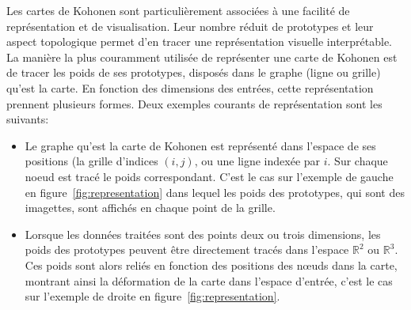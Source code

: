 Les cartes de Kohonen sont particulièrement associées à une facilité de représentation et de visualisation. Leur nombre réduit de prototypes et leur aspect topologique permet d'en tracer une représentation visuelle interprétable.
La manière la plus couramment utilisée de représenter une carte de Kohonen est de tracer les poids de ses prototypes, disposés dans le graphe (ligne ou grille) qu'est la carte. En fonction des dimensions des entrées, cette représentation prennent plusieurs formes. Deux exemples courants de représentation sont les suivants: 
\begin{itemize}
\item Le graphe qu'est la carte de Kohonen est représenté dans l'espace de ses positions (la grille d'indices $(i,j)$, ou une ligne indexée par $i$. Sur chaque noeud est tracé le poids correspondant. C'est le cas sur l'exemple de gauche en figure~\ref{fig:representation} dans lequel les poids des prototypes, qui sont des imagettes, sont affichés en chaque point de la grille. 
\item Lorsque les données traitées sont des points deux ou trois dimensions, les poids des prototypes peuvent être directement tracés dans l'espace $\mathbb{R}^2$ ou $\mathbb{R}^3$. Ces poids sont alors reliés en fonction des positions des n\oe{}uds dans la carte, montrant ainsi la déformation de la carte dans l'espace d'entrée, c'est le cas sur l'exemple de droite en figure~\ref{fig:representation}.
\end{itemize}

